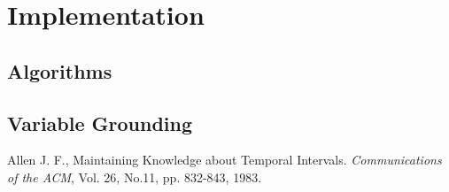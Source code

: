 \documentclass[11pt]{report}
\begin{document}
  \chapter{Implementation}

    \section{Algorithms}

    \section{Variable Grounding}

  \begin{thebibliography}{00}
      Allen J. F.,
      Maintaining Knowledge about Temporal Intervals.
      {\em Communications of the ACM},
      Vol. 26, No.11, pp. 832-843,
      1983.
  \end{thebibliography}
\end{document}
